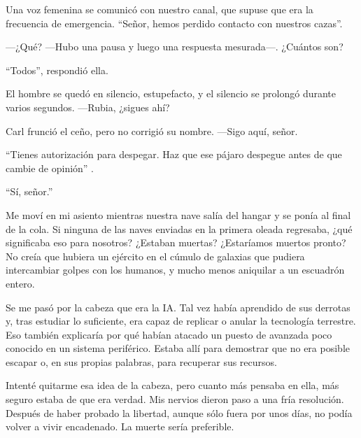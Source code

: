 Una voz femenina se comunicó con nuestro canal, que supuse que era la frecuencia de emergencia. ``Señor, hemos perdido contacto con nuestros cazas''.

—¿Qué? —Hubo una pausa y luego una respuesta mesurada—. ¿Cuántos son?

``Todos'', respondió ella.

El hombre se quedó en silencio, estupefacto, y el silencio se prolongó durante varios segundos. —Rubia, ¿sigues ahí?

Carl frunció el ceño, pero no corrigió su nombre. —Sigo aquí, señor.

``Tienes autorización para despegar. Haz que ese pájaro despegue antes de que cambie de opinión''
.

``Sí, señor.''


Me moví en mi asiento mientras nuestra nave salía del hangar y se ponía al final de la cola. Si ninguna de las naves enviadas en la primera oleada regresaba, ¿qué significaba eso para nosotros? ¿Estaban muertas? ¿Estaríamos muertos pronto? No creía que hubiera un ejército en el cúmulo de galaxias que pudiera intercambiar golpes con los humanos, y mucho menos aniquilar a un escuadrón entero.

Se me pasó por la cabeza que era la IA. Tal vez había aprendido de sus derrotas y, tras estudiar lo suficiente, era capaz de replicar o anular la tecnología terrestre. Eso también explicaría por qué habían atacado un puesto de avanzada poco conocido en un sistema periférico. Estaba allí para demostrar que no era posible escapar o, en sus propias palabras, para recuperar sus recursos.

Intenté quitarme esa idea de la cabeza, pero cuanto más pensaba en ella, más seguro estaba de que era verdad. Mis nervios dieron paso a una fría resolución. Después de haber probado la libertad, aunque sólo fuera por unos días, no podía volver a vivir encadenado. La muerte sería preferible.